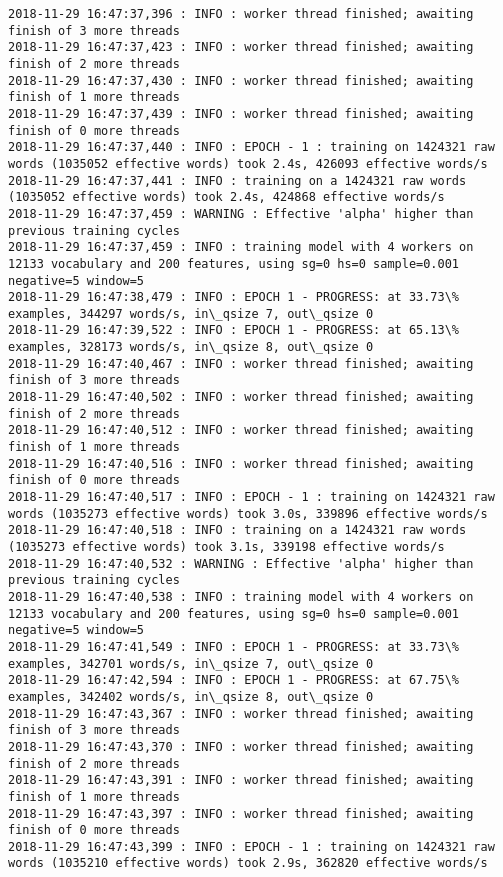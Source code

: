 \documentclass[11pt]{article}
\begin{document}
\begin{Verbatim}[commandchars=\\\{\}]
2018-11-29 16:47:37,396 : INFO : worker thread finished; awaiting finish of 3 more threads
2018-11-29 16:47:37,423 : INFO : worker thread finished; awaiting finish of 2 more threads
2018-11-29 16:47:37,430 : INFO : worker thread finished; awaiting finish of 1 more threads
2018-11-29 16:47:37,439 : INFO : worker thread finished; awaiting finish of 0 more threads
2018-11-29 16:47:37,440 : INFO : EPOCH - 1 : training on 1424321 raw words (1035052 effective words) took 2.4s, 426093 effective words/s
2018-11-29 16:47:37,441 : INFO : training on a 1424321 raw words (1035052 effective words) took 2.4s, 424868 effective words/s
2018-11-29 16:47:37,459 : WARNING : Effective 'alpha' higher than previous training cycles
2018-11-29 16:47:37,459 : INFO : training model with 4 workers on 12133 vocabulary and 200 features, using sg=0 hs=0 sample=0.001 negative=5 window=5
2018-11-29 16:47:38,479 : INFO : EPOCH 1 - PROGRESS: at 33.73\% examples, 344297 words/s, in\_qsize 7, out\_qsize 0
2018-11-29 16:47:39,522 : INFO : EPOCH 1 - PROGRESS: at 65.13\% examples, 328173 words/s, in\_qsize 8, out\_qsize 0
2018-11-29 16:47:40,467 : INFO : worker thread finished; awaiting finish of 3 more threads
2018-11-29 16:47:40,502 : INFO : worker thread finished; awaiting finish of 2 more threads
2018-11-29 16:47:40,512 : INFO : worker thread finished; awaiting finish of 1 more threads
2018-11-29 16:47:40,516 : INFO : worker thread finished; awaiting finish of 0 more threads
2018-11-29 16:47:40,517 : INFO : EPOCH - 1 : training on 1424321 raw words (1035273 effective words) took 3.0s, 339896 effective words/s
2018-11-29 16:47:40,518 : INFO : training on a 1424321 raw words (1035273 effective words) took 3.1s, 339198 effective words/s
2018-11-29 16:47:40,532 : WARNING : Effective 'alpha' higher than previous training cycles
2018-11-29 16:47:40,538 : INFO : training model with 4 workers on 12133 vocabulary and 200 features, using sg=0 hs=0 sample=0.001 negative=5 window=5
2018-11-29 16:47:41,549 : INFO : EPOCH 1 - PROGRESS: at 33.73\% examples, 342701 words/s, in\_qsize 7, out\_qsize 0
2018-11-29 16:47:42,594 : INFO : EPOCH 1 - PROGRESS: at 67.75\% examples, 342402 words/s, in\_qsize 8, out\_qsize 0
2018-11-29 16:47:43,367 : INFO : worker thread finished; awaiting finish of 3 more threads
2018-11-29 16:47:43,370 : INFO : worker thread finished; awaiting finish of 2 more threads
2018-11-29 16:47:43,391 : INFO : worker thread finished; awaiting finish of 1 more threads
2018-11-29 16:47:43,397 : INFO : worker thread finished; awaiting finish of 0 more threads
2018-11-29 16:47:43,399 : INFO : EPOCH - 1 : training on 1424321 raw words (1035210 effective words) took 2.9s, 362820 effective words/s

\end{Verbatim}
\end{document}
